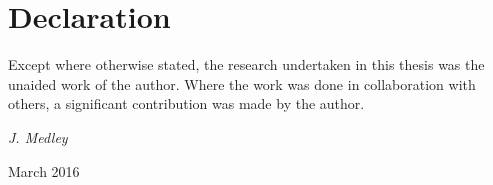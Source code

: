 \chapter*{Declaration}

\normalsize
Except where otherwise stated, the research undertaken in this thesis
was the unaided work of the author. Where the work was done in collaboration
with others, a significant contribution was made by the author.


\vspace{20mm}
\hfill {\it J. Medley}

\hfill March 2016


